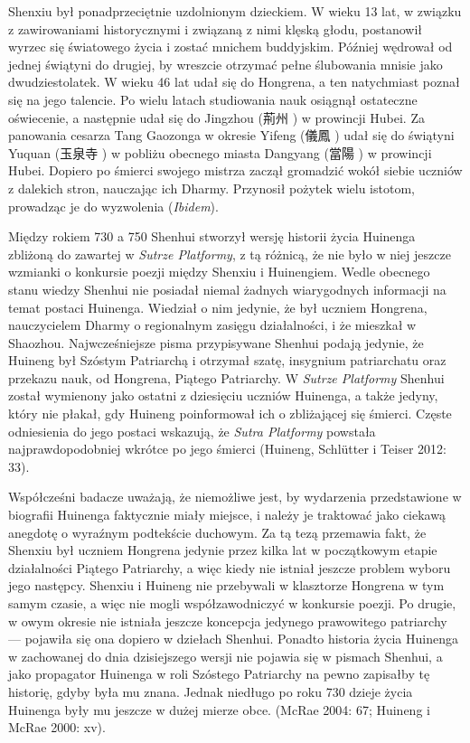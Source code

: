 Shenxiu był ponadprzeciętnie uzdolnionym dzieckiem. W wieku 13 lat, w związku z zawirowaniami historycznymi i związaną z nimi klęską głodu, postanowił wyrzec się światowego życia i zostać mnichem buddyjskim. Później wędrował od jednej świątyni do drugiej, by wreszcie otrzymać pełne ślubowania mnisie jako dwudziestolatek. W wieku 46 lat udał się do Hongrena, a ten natychmiast poznał się na jego talencie. Po wielu latach studiowania nauk osiągnął ostateczne oświecenie, a następnie udał się do Jingzhou (荊州 ) w prowincji Hubei. Za panowania cesarza Tang Gaozonga w okresie Yifeng (儀鳳 ) udał się do świątyni Yuquan (玉泉寺 ) w pobliżu obecnego miasta Dangyang (當陽 ) w prowincji Hubei. Dopiero po śmierci swojego mistrza zaczął gromadzić wokół siebie uczniów z dalekich stron, nauczając ich Dharmy. Przynosił pożytek wielu istotom, prowadząc je do wyzwolenia (\textit{Ibidem}). %

Między rokiem 730 a 750 Shenhui stworzył wersję historii życia Huinenga zbliżoną do zawartej w \textit{Sutrze Platformy}, z tą różnicą, że nie było w niej jeszcze wzmianki o konkursie poezji między Shenxiu i Huinengiem. Wedle obecnego stanu wiedzy Shenhui nie posiadał niemal żadnych wiarygodnych informacji na temat postaci Huinenga. Wiedział o nim jedynie, że był uczniem Hongrena, nauczycielem Dharmy o regionalnym zasięgu działalności, i że mieszkał w Shaozhou. Najwcześniejsze pisma przypisywane Shenhui podają jedynie, że Huineng był Szóstym Patriarchą i otrzymał szatę, insygnium patriarchatu oraz przekazu nauk, od Hongrena, Piątego Patriarchy. W \textit{Sutrze Platformy} Shenhui został wymienony jako ostatni z dziesięciu uczniów Huinenga, a także jedyny, który nie płakał, gdy Huineng poinformował ich o zbliżającej się śmierci. Częste odniesienia do jego postaci wskazują, że \textit{Sutra Platformy} powstała najprawdopodobniej wkrótce po jego śmierci
(Huineng, Schlütter i Teiser 2012: 33).

Współcześni badacze uważają, że niemożliwe jest, by wydarzenia przedstawione w biografii Huinenga faktycznie miały miejsce, i należy je traktować jako ciekawą anegdotę o wyraźnym podtekście duchowym. Za tą tezą przemawia fakt, że Shenxiu był uczniem Hongrena jedynie przez kilka lat w początkowym etapie działalności Piątego Patriarchy, a więc kiedy nie istniał jeszcze problem wyboru jego następcy. Shenxiu i Huineng nie przebywali w klasztorze Hongrena w tym samym czasie, a więc nie mogli współzawodniczyć w konkursie poezji. Po drugie, w owym okresie nie istniała jeszcze koncepcja jedynego prawowitego patriarchy --- pojawiła się ona dopiero w dziełach Shenhui. Ponadto historia życia Huinenga w zachowanej do dnia dzisiejszego wersji nie pojawia się w pismach Shenhui, a jako propagator Huinenga w roli Szóstego Patriarchy na pewno zapisałby tę historię, gdyby była mu znana. Jednak niedługo po roku 730 dzieje życia Huinenga były mu jeszcze w dużej mierze obce. (McRae 2004: 67; Huineng i McRae 2000: xv).

